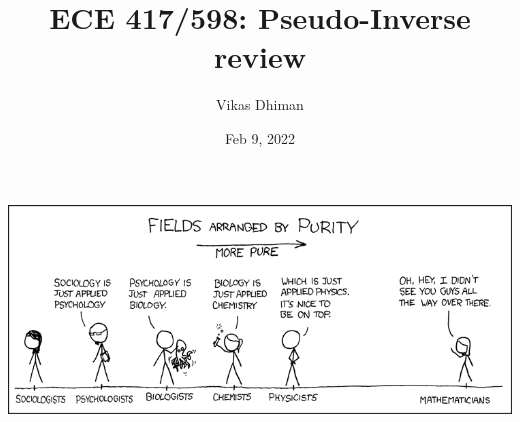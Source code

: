\documentclass[times]{beamer}
\title{ECE 417/598: Pseudo-Inverse review}
\author{Vikas Dhiman}
\date{Feb 9, 2022}
\begin{document}
\begin{frame}
  \titlepage
  \end{frame}
  \begin{frame}
    \includegraphics[width=\linewidth]{media/purity.png}
  \end{frame}
\end{document}
